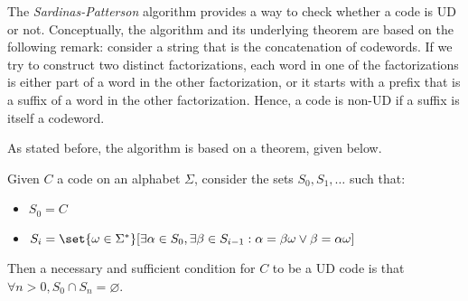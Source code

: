 \documentclass{subfiles}
\begin{document}
    The \emph{Sardinas-Patterson} algorithm provides a way to check whether a code is UD or not. 
        Conceptually, the algorithm and its underlying theorem are based on the following remark: 
        consider a string that is the concatenation of codewords.
        If we try to construct two distinct factorizations, 
        each word in one of the factorizations is either part of a word in the other factorization,
        or it starts with a prefix that is a suffix of a word in the other factorization.
        Hence, a code is non-UD if a suffix is itself a codeword.

    As stated before, the algorithm is based on a theorem, given below.
    \begin{theorem}\label{Thm:1}
        Given \(C\) a code on an alphabet \(\Sigma\), 
            consider the sets \(S_{0}, S_{1}, \ldots\) such that:
            \begin{itemize}
                \item \(S_{0} = C\) 
                \item \(S_{i} = \set{\omega \in \Sigma^{*}}[
                    \exists \alpha \in S_{0}, \exists \beta \in S_{i - 1} : 
                    \alpha = \beta \omega \lor \beta = \alpha \omega
                ]\)
            \end{itemize}
        Then a necessary and sufficient condition for \(C\) to be a UD code is that
            \(\forall n > 0, S_{0} \cap S_{n} = \varnothing\).
    \end{theorem}
    \clearpage
\end{document}
